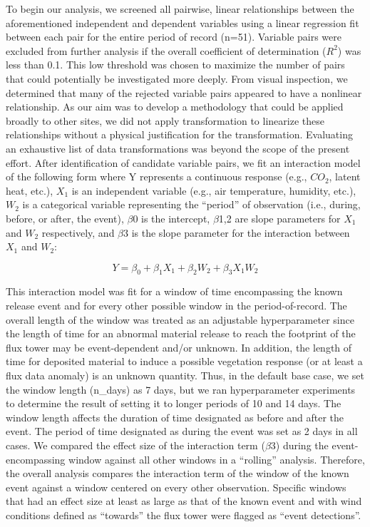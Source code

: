 \documentclass{article}
\begin{document}
To begin our analysis, we screened all pairwise, linear relationships between the aforementioned independent and dependent variables using a linear regression fit between each pair for the entire period of record (n=51). Variable pairs were excluded from further analysis if the overall coefficient of determination ($R^2$) was less than 0.1. This low threshold was chosen to maximize the number of pairs that could potentially be investigated more deeply. From visual inspection, we determined that many of the rejected variable pairs appeared to have a nonlinear relationship. As our aim was to develop a methodology that could be applied broadly to other sites, we did not apply transformation to linearize these relationships without a physical justification for the transformation. Evaluating an exhaustive list of data transformations was beyond the scope of the present effort. After identification of candidate variable pairs, we fit an interaction model of the following form where Y represents a continuous response (e.g., $CO_2$, latent heat, etc.), $X_1$ is an independent variable (e.g., air temperature, humidity, etc.), $W_2$ is a categorical variable representing the “period” of observation (i.e., during, before, or after, the event), $\beta$0 is the intercept, $\beta$1,2 are slope parameters for $X_1$ and $W_2$ respectively, and $\beta$3 is the slope parameter for the interaction between $X_1$ and $W_2$:

\[ Y = \beta_0 + \beta_1X_1 + \beta_2W_2 + \beta_3X_1W_2 \]

This interaction model was fit for a window of time encompassing the known release event and for every other possible window in the period-of-record. The overall length of the window was treated as an adjustable hyperparameter since the length of time for an abnormal material release to reach the footprint of the flux tower may be event-dependent and/or unknown. In addition, the length of time for deposited material to induce a possible vegetation response (or at least a flux data anomaly) is an unknown quantity. Thus, in the default base case, we set the window length (n\_days) as 7 days, but we ran hyperparameter experiments to determine the result of setting it to longer periods of 10 and 14 days. The window length affects the duration of time designated as before and after the event. The period of time designated as during the event was set as 2 days in all cases. We compared the effect size of the interaction term ($\beta$3) during the event-encompassing window against all other windows in a “rolling” analysis. Therefore, the overall analysis compares the interaction term of the window of the known event against a window centered on every other observation. Specific windows that had an effect size at least as large as that of the known event and with wind conditions defined as “towards” the flux tower were flagged as “event detections”.
\end{document}

